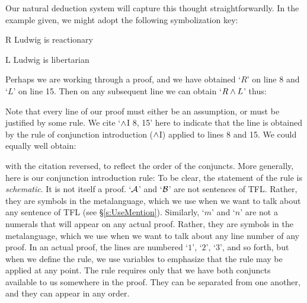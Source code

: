 Our natural deduction system will capture this thought straightforwardly. In the example given, we might adopt the following symbolization key:
	\begin{ekey}
		\item[R] Ludwig is reactionary
		\item[L] Ludwig is libertarian
	\end{ekey}
Perhaps we are working through a proof, and we have obtained `$R$' on line 8 and `$L$' on line 15. Then on any subsequent line we can obtain `$R \wedge L$' thus:
\begin{fitchproof}
	 
\end{fitchproof}
Note that every line of our proof must either be an assumption, or must be justified by some rule. We cite `$\wedge$I 8, 15' here to indicate that the line is obtained by the rule of conjunction introduction ($\wedge$I) applied to lines 8 and 15. We could equally well obtain:
\begin{fitchproof}
	 
\end{fitchproof}
with the citation reversed, to reflect the order of the conjuncts. More generally, here is our conjunction introduction rule:
To be clear, the statement of the rule is \emph{schematic}. It is not itself a proof.  `$\mathcal{A}$' and `$\mathcal{B}$' are not sentences of TFL. Rather, they are symbols in the metalanguage, which we use when we want to talk about any sentence of TFL (see \S\ref{s:UseMention}). Similarly, `$m$' and `$n$' are not a numerals that will appear on any actual proof. Rather, they are symbols in the metalanguage, which we use when we want to talk about any line number of any proof. In an actual proof, the lines are numbered `$1$', `$2$', `$3$', and so forth, but when we define the rule, we use variables to emphasize that the rule may be applied at any point. The rule requires only that we have both conjuncts available to us somewhere in the proof. They can be separated from one another, and they can appear in any order. 

